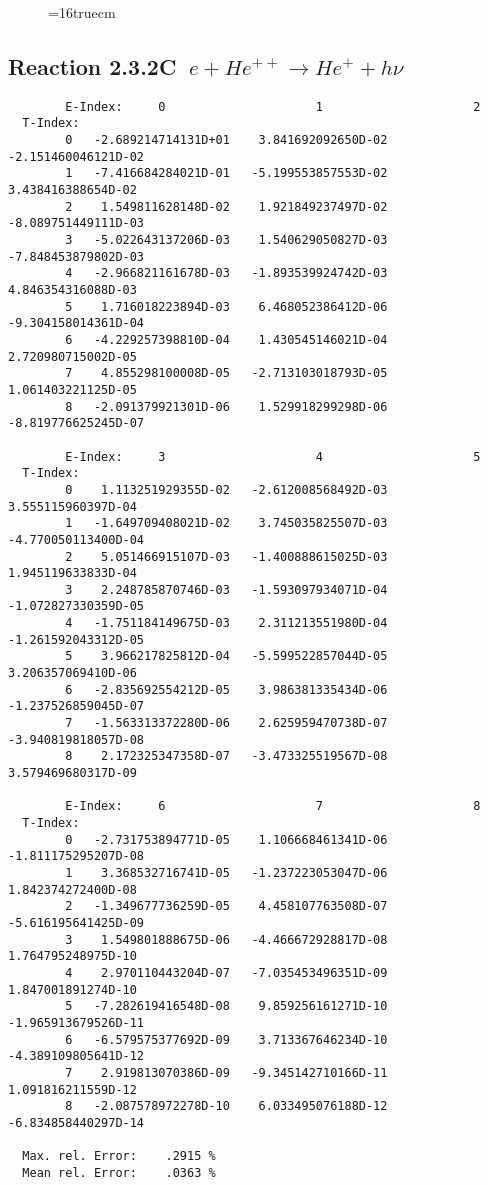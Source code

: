 \documentclass[12pt]{article}
\begin{document}
\begin{figure} \label{2.3.2B1}
\epsfxsize=16truecm
\end{figure}
\newpage

\subsection{
Reaction 2.3.2C   $\  e + He^{++} \rightarrow  He^+ + h\nu$
}

\begin{small}\begin{verbatim}
        E-Index:     0                     1                     2
  T-Index:
        0   -2.689214714131D+01    3.841692092650D-02   -2.151460046121D-02
        1   -7.416684284021D-01   -5.199553857553D-02    3.438416388654D-02
        2    1.549811628148D-02    1.921849237497D-02   -8.089751449111D-03
        3   -5.022643137206D-03    1.540629050827D-03   -7.848453879802D-03
        4   -2.966821161678D-03   -1.893539924742D-03    4.846354316088D-03
        5    1.716018223894D-03    6.468052386412D-06   -9.304158014361D-04
        6   -4.229257398810D-04    1.430545146021D-04    2.720980715002D-05
        7    4.855298100008D-05   -2.713103018793D-05    1.061403221125D-05
        8   -2.091379921301D-06    1.529918299298D-06   -8.819776625245D-07

        E-Index:     3                     4                     5
  T-Index:
        0    1.113251929355D-02   -2.612008568492D-03    3.555115960397D-04
        1   -1.649709408021D-02    3.745035825507D-03   -4.770050113400D-04
        2    5.051466915107D-03   -1.400888615025D-03    1.945119633833D-04
        3    2.248785870746D-03   -1.593097934071D-04   -1.072827330359D-05
        4   -1.751184149675D-03    2.311213551980D-04   -1.261592043312D-05
        5    3.966217825812D-04   -5.599522857044D-05    3.206357069410D-06
        6   -2.835692554212D-05    3.986381335434D-06   -1.237526859045D-07
        7   -1.563313372280D-06    2.625959470738D-07   -3.940819818057D-08
        8    2.172325347358D-07   -3.473325519567D-08    3.579469680317D-09

        E-Index:     6                     7                     8
  T-Index:
        0   -2.731753894771D-05    1.106668461341D-06   -1.811175295207D-08
        1    3.368532716741D-05   -1.237223053047D-06    1.842374272400D-08
        2   -1.349677736259D-05    4.458107763508D-07   -5.616195641425D-09
        3    1.549801888675D-06   -4.466672928817D-08    1.764795248975D-10
        4    2.970110443204D-07   -7.035453496351D-09    1.847001891274D-10
        5   -7.282619416548D-08    9.859256161271D-10   -1.965913679526D-11
        6   -6.579575377692D-09    3.713367646234D-10   -4.389109805641D-12
        7    2.919813070386D-09   -9.345142710166D-11    1.091816211559D-12
        8   -2.087578972278D-10    6.033495076188D-12   -6.834858440297D-14

  Max. rel. Error:    .2915 %
  Mean rel. Error:    .0363 %


\end{verbatim}\end{small}
\end{document}
